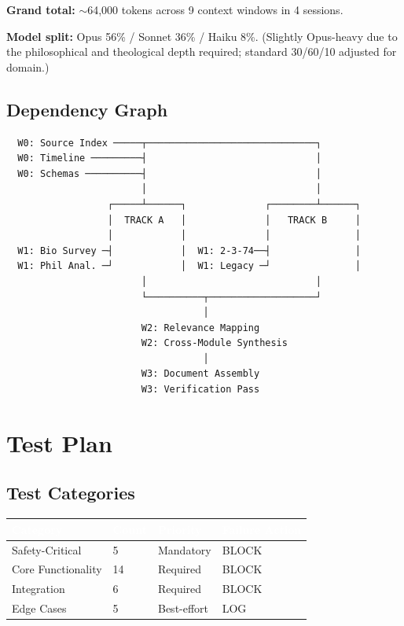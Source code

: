 \documentclass[11pt,letterpaper]{article}
\newcommand{\tableheader}[1]{\textbf{\sffamily\textcolor{white}{#1}}}
\begin{document}
\textbf{Grand total:} $\sim$64,000 tokens across 9 context windows in 4 sessions.

\textbf{Model split:} Opus 56\% / Sonnet 36\% / Haiku 8\%. (Slightly Opus-heavy due to the philosophical and theological depth required; standard 30/60/10 adjusted for domain.)

\subsection{Dependency Graph}

\begin{asciibox}
\begin{verbatim}
  W0: Source Index ─────┬──────────────────────────────┐
  W0: Timeline ─────────┤                              │
  W0: Schemas ──────────┤                              │
                        │                              │
                  ┌─────┴──────┐              ┌────────┴──────┐
                  │  TRACK A   │              │   TRACK B     │
                  │            │              │               │
  W1: Bio Survey ─┤            │  W1: 2-3-74──┤               │
  W1: Phil Anal. ─┘            │  W1: Legacy ─┘               │
                        │                              │
                        └──────────┬───────────────────┘
                                   │
                        W2: Relevance Mapping
                        W2: Cross-Module Synthesis
                                   │
                        W3: Document Assembly
                        W3: Verification Pass
\end{verbatim}
\end{asciibox}

\section{Test Plan}

\subsection{Test Categories}

\begin{center}
\begin{tabularx}{\textwidth}{L{3cm}C{1.5cm}C{1.5cm}C{2cm}}
\toprule
{}
\tableheader{Category} & \tableheader{Count} & \tableheader{Priority} & \tableheader{Failure Action} \\
\midrule
Safety-Critical & 5 & Mandatory & BLOCK \\
Core Functionality & 14 & Required & BLOCK \\
Integration & 6 & Required & BLOCK \\
Edge Cases & 5 & Best-effort & LOG \\
\bottomrule
\end{tabularx}
\end{center}
\end{document}
